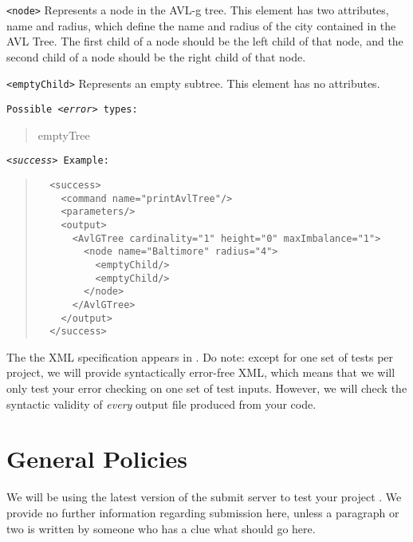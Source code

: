 \documentclass[12pt]{article}
\newenvironment{Description}
   {\begin{list}{}{\let\makelabel\Descriptionlabel
      \setlength\leftmargin{\labelwidth+\labelsep}
      \setlength\itemindent{-0.3em}}}%
   {\end{list}}
\newcommand*{\Descriptionlabel}[1]{%
  \parbox[b]{\labelwidth}
  {\makebox[0pt][l]{\textbf{#1}}\\}
  \hfill}
\begin{document}
\begin{Description}
\begin{Description}
\begin{quote}
\end{quote}
		
	\begin{Description}
  
  \item[\texttt{<node>}]
  Represents a node in the AVL-g tree. This element has two attributes, name and radius, which define the name and radius of the city contained in the AVL Tree. The first child of a node should be the left child of that node, and the second child of a node should be the right child of that node.
  
	\item[\texttt{<emptyChild>}]
  Represents an empty subtree. This element has no attributes. 

  \end{Description}
	
	\texttt{Possible \emph{<error>} types:}
	\begin{quote}
		emptyTree
	\end{quote}
	
  \texttt{\emph{<success>} Example:}
	\begin{quote}
	\begin{verbatim}
  <success>
    <command name="printAvlTree"/>
    <parameters/>
    <output>
      <AvlGTree cardinality="1" height="0" maxImbalance="1">
        <node name="Baltimore" radius="4">
          <emptyChild/>
          <emptyChild/>
        </node>
      </AvlGTree>
    </output>
  </success>
	\end{verbatim}
	\end{quote}

\end{Description}
\end{Description}


The  the XML specification  appears in
.
Do note: except for one set of tests per project,
we will provide  syntactically error-free XML, which means
that we will only test your error checking on one set of test inputs.
However, we will check the syntactic validity of \emph{every} output
file produced from  your code.

\section{General Policies}


We will be using the latest version of the
 submit server to test your project 
. We provide
no further information regarding submission here, unless  a paragraph
or two is written by someone who has a clue what should go here.
\end{document}
